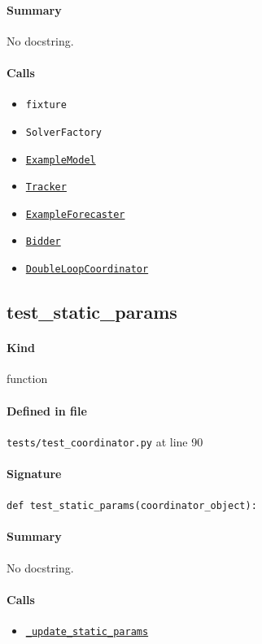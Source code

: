 \documentclass[11pt]{report}
\begin{document}
\paragraph{Summary} No docstring.
\paragraph{Calls}
\begin{itemize}[leftmargin=*]
  \item \texttt{fixture}
  \item \texttt{SolverFactory}
  \item \hyperref[def:tests-util.py:ExampleModel:L25]{\texttt{ExampleModel}}
  \item \hyperref[def:tracker.py:Tracker:L19]{\texttt{Tracker}}
  \item \hyperref[def:tests-util.py:ExampleForecaster:L259]{\texttt{ExampleForecaster}}
  \item \hyperref[def:bidder.py:Bidder:L1000]{\texttt{Bidder}}
  \item \hyperref[def:coordinator.py:DoubleLoopCoordinator:L30]{\texttt{DoubleLoopCoordinator}}
\end{itemize}
\subsection{test\_static\_params}
\label{def:tests-test_coordinator.py:test_static_params:L90}
\paragraph{Kind} function
\paragraph{Defined in file} \texttt{tests/test\_coordinator.py} at line 90
\paragraph{Signature} \texttt{def test\_static\_params(coordinator\_object):}
\paragraph{Summary} No docstring.
\paragraph{Calls}
\begin{itemize}[leftmargin=*]
  \item \hyperref[def:coordinator.py:DoubleLoopCoordinator._update_static_params:L399]{\texttt{\_update\_static\_params}}
\end{itemize}
\end{document}
